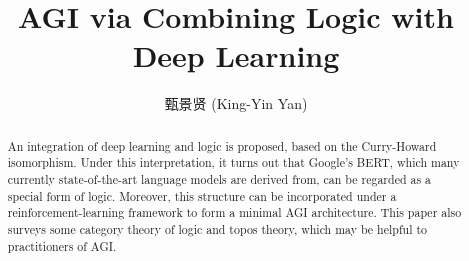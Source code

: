 \documentclass[orivec]{llncs}
\title{AGI via Combining Logic with Deep Learning}
\author{
甄景贤 (King-Yin Yan) 
}
\institute{General.Intelligence@Gmail.com}
\begin{document}
\maketitle

\setlength{\parindent}{0em}
\setlength{\parskip}{2.8ex plus0.8ex minus0.8ex}

\begin{abstract}
An integration of deep learning and logic is proposed, based on the Curry-Howard isomorphism.  Under this interpretation, it turns out that Google's BERT, which many currently state-of-the-art language models are derived from, can be regarded as a special form of logic.  Moreover, this structure can be incorporated under a reinforcement-learning framework to form a minimal AGI architecture.  This paper also surveys some category theory of logic and topos theory, which may be helpful to practitioners of AGI.
\end{abstract}
\end{document}
